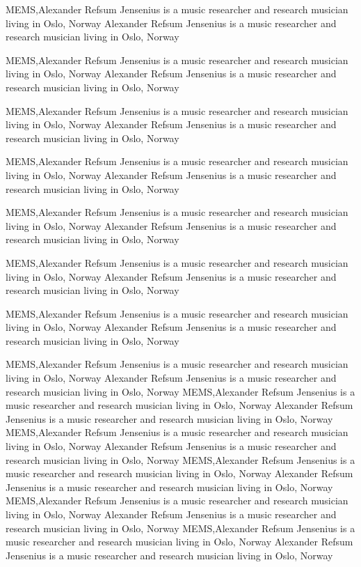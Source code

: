 MEMS,Alexander Refsum Jensenius is a music researcher and research musician living in Oslo, Norway Alexander Refsum Jensenius is a music researcher and research musician living in Oslo, Norway

MEMS,Alexander Refsum Jensenius is a music researcher and research musician living in Oslo, Norway Alexander Refsum Jensenius is a music researcher and research musician living in Oslo, Norway

MEMS,Alexander Refsum Jensenius is a music researcher and research musician living in Oslo, Norway Alexander Refsum Jensenius is a music researcher and research musician living in Oslo, Norway

MEMS,Alexander Refsum Jensenius is a music researcher and research musician living in Oslo, Norway Alexander Refsum Jensenius is a music researcher and research musician living in Oslo, Norway

MEMS,Alexander Refsum Jensenius is a music researcher and research musician living in Oslo, Norway Alexander Refsum Jensenius is a music researcher and research musician living in Oslo, Norway

MEMS,Alexander Refsum Jensenius is a music researcher and research musician living in Oslo, Norway Alexander Refsum Jensenius is a music researcher and research musician living in Oslo, Norway

MEMS,Alexander Refsum Jensenius is a music researcher and research musician living in Oslo, Norway Alexander Refsum Jensenius is a music researcher and research musician living in Oslo, Norway

MEMS,Alexander Refsum Jensenius is a music researcher and research musician living in Oslo, Norway Alexander Refsum Jensenius is a music researcher and research musician living in Oslo, Norway
MEMS,Alexander Refsum Jensenius is a music researcher and research musician living in Oslo, Norway Alexander Refsum Jensenius is a music researcher and research musician living in Oslo, Norway
MEMS,Alexander Refsum Jensenius is a music researcher and research musician living in Oslo, Norway Alexander Refsum Jensenius is a music researcher and research musician living in Oslo, Norway
MEMS,Alexander Refsum Jensenius is a music researcher and research musician living in Oslo, Norway Alexander Refsum Jensenius is a music researcher and research musician living in Oslo, Norway
MEMS,Alexander Refsum Jensenius is a music researcher and research musician living in Oslo, Norway Alexander Refsum Jensenius is a music researcher and research musician living in Oslo, Norway
MEMS,Alexander Refsum Jensenius is a music researcher and research musician living in Oslo, Norway Alexander Refsum Jensenius is a music researcher and research musician living in Oslo, Norway

